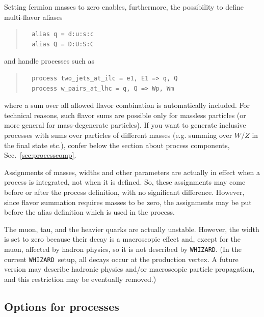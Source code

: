 \documentclass[12pt]{book}
\newcommand{\ttt}[1]{\texttt{#1}}
\newcommand{\whizard}{\ttt{WHIZARD}}
\begin{document}
Setting fermion masses to zero enables, furthermore, the possibility to define
multi-flavor aliases
\begin{quote}
\begin{footnotesize}
\begin{verbatim}
  alias q = d:u:s:c
  alias Q = D:U:S:C
\end{verbatim}
\end{footnotesize}
\end{quote}
and handle processes such as
\begin{quote}
\begin{footnotesize}
\begin{verbatim}
  process two_jets_at_ilc = e1, E1 => q, Q
  process w_pairs_at_lhc = q, Q => Wp, Wm
\end{verbatim}
\end{footnotesize}
\end{quote}
where a sum over all allowed flavor combination is automatically included.
For technical reasons, such flavor sums are possible only for massless
particles (or more general for mass-degenerate particles). If you want
to generate inclusive processes with sums over particles of different
masses (e.g. summing over $W/Z$ in the final state etc.), confer below
the section about process components, Sec.~\ref{sec:processcomp}.

Assignments of masses, widths and other parameters are actually in effect when
a process is integrated, not when it is defined.  So, these assignments may
come before or after the process definition, with no significant difference.
However, since flavor summation requires masses to be zero, the assignments
may be put before the alias definition which is used in the process.

The muon, tau, and the heavier quarks are actually unstable.  However, the
width is set to zero because their decay is a macroscopic effect and, except for
the muon, affected by hadron physics, so it is not described by \whizard.  (In
the current \whizard\ setup, all decays occur at the production vertex.  A
future version may describe hadronic physics and/or macroscopic particle
propagation, and this restriction may be eventually removed.)




\subsection{Options for processes}
\label{sec:process options}
\end{document}

